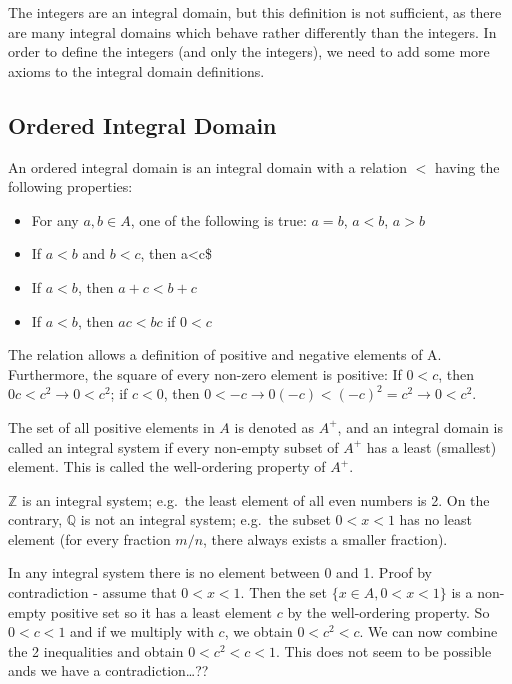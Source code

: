 
The integers are an integral domain, but this definition is not
sufficient, as there are many integral domains which behave rather
differently than the integers. In order to define the integers (and only
the integers), we need to add some more axioms to the integral domain
definitions.

\subsection{Ordered Integral Domain}\label{ordered-integral-domain}

An ordered integral domain is an integral domain with a relation \(<\)
having the following properties:

\begin{itemize}
\item
  For any \(a, b \in A\), one of the following is true: \(a=b\),
  \(a<b\), \(a>b\)
\item
  If \(a<b\) and \(b<c\), then a\textless{}c\$
\item
  If \(a<b\), then \(a+c<b+c\)
\item
  If \(a<b\), then \(ac<bc\) if \(0<c\)
\end{itemize}

The relation allows a definition of positive and negative elements of A.
Furthermore, the square of every non-zero element is positive: If
\(0<c\), then \(0c < c^2 \rightarrow 0<c^2\); if \(c<0\), then
\(0<-c \rightarrow 0(-c) < (-c)^2 = c^2 \rightarrow 0 < c^2\).

The set of all positive elements in \(A\) is denoted as \(A^+\), and an
integral domain is called an integral system if every non-empty subset
of \(A^+\) has a least (smallest) element. This is called the
well-ordering property of \(A^+\).

\(\mathbb{Z}\) is an integral system; e.g.~the least element of all even
numbers is 2. On the contrary, \(\mathbb{Q}\) is not an integral system;
e.g.~the subset \(0<x<1\) has no least element (for every fraction
\(m/n\), there always exists a smaller fraction).

In any integral system there is no element between 0 and 1. Proof by
contradiction - assume that \(0<x<1\). Then the set
\(\{x \in A, 0<x<1\}\) is a non-empty positive set so it has a least
element \(c\) by the well-ordering property. So \(0<c<1\) and if we
multiply with \(c\), we obtain \(0<c^2<c\). We can now combine the 2
inequalities and obtain \(0<c^2<c<1\). This does not seem to be possible
ands we have a contradiction\ldots{}??

